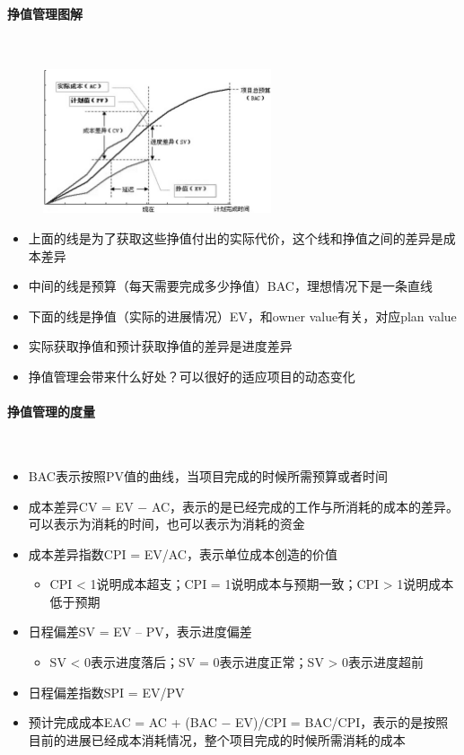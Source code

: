 \paragraph{挣值管理图解}~{} \par
\begin{figure}[H]
    \vspace{-0.5em}
	\centering
	\includegraphics[width=0.6\textwidth]{images/挣值管理图解.png}
    \vspace{-1em}
\end{figure}

\begin{itemize}
    \item 上面的线是为了获取这些挣值付出的实际代价，这个线和挣值之间的差异是成本差异
    \item 中间的线是预算（每天需要完成多少挣值）BAC，理想情况下是一条直线
    \item 下面的线是挣值（实际的进展情况）EV，和owner value有关，对应plan value
    \item 实际获取挣值和预计获取挣值的差异是进度差异
    \item 挣值管理会带来什么好处？可以很好的适应项目的动态变化
\end{itemize}

\paragraph{挣值管理的度量}~{} \par
\begin{itemize}
    \item BAC表示按照PV值的曲线，当项目完成的时候所需预算或者时间
    \item 成本差异CV = EV $-$ AC，表示的是已经完成的工作与所消耗的成本的差异。可以表示为消耗的时间，也可以表示为消耗的资金
    \item 成本差异指数CPI = EV/AC，表示单位成本创造的价值
    \begin{itemize}
        \item CPI < 1说明成本超支；CPI = 1说明成本与预期一致；CPI > 1说明成本低于预期
    \end{itemize}
    \item 日程偏差SV = EV $–$ PV，表示进度偏差
    \begin{itemize}
        \item SV < 0表示进度落后；SV = 0表示进度正常；SV > 0表示进度超前
    \end{itemize}
    \item 日程偏差指数SPI = EV/PV
    \item 预计完成成本EAC = AC + (BAC $-$ EV)/CPI = BAC/CPI，表示的是按照目前的进展已经成本消耗情况，整个项目完成的时候所需消耗的成本
\end{itemize}

